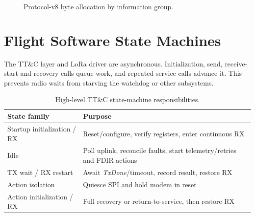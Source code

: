 \begin{figure}[H]
\centering
{}
\caption{Protocol-v8 byte allocation by information group.}
\label{fig:ttc-packet-groups}
\end{figure}




\section{Flight Software State Machines}

The TT\&C layer and LoRa driver are asynchronous. Initialization, send,
receive-start and recovery calls queue work, and repeated service calls advance
it. This prevents radio waits from starving the watchdog or other subsystems.

\begin{table}[H]
\centering
\begin{tabular}{p{3.7cm}p{10.5cm}}
\toprule
\textbf{State family} & \textbf{Purpose} \\
\midrule
Startup initialization / RX & Reset/configure, verify registers, enter continuous RX \\
Idle & Poll uplink, reconcile faults, start telemetry/retries and FDIR actions \\
TX wait / RX restart & Await \textit{TxDone}/timeout, record result, restore RX \\
Action isolation & Quiesce SPI and hold modem in reset \\
Action initialization / RX & Full recovery or return-to-service, then restore RX \\
\bottomrule
\end{tabular}
\caption{High-level TT\&C state-machine responsibilities.}
\end{table}


